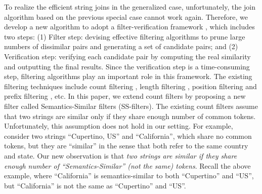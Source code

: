


To realize the efficient string joins in the generalized case,
unfortunately, the join algorithm based on the previous special case
cannot work again. Therefore, we develop a new algorithm to adopt a
filter-verification framework \cite{conf/cpm/SutinenT96,conf/sigmod/LuLWLW13}, which includes two steps: (1) Filter step: devising effective filtering algorithms to prune large numbers of dissimilar pairs and generating a set of candidate pairs; and (2) Verification step: verifying each candidate pair by computing
the real similarity and outputting the final results. Since the verification step is a time-consuming step,  filtering algorithms play an important role in this framework.  The existing filtering techniques include count filtering \cite{conf/vldb/GravanoIJKMS01}, length filtering \cite{conf/vldb/ArasuGK06}, position
filtering \cite{conf/esa/SutinenT95} and prefix filtering \cite{conf/sigmod/WangLF12}, etc. In this paper, we extend count filters by proposing a new filter called Semantics-Similar filters (SS-filters). The existing count filters assume that two strings are similar only if they share enough number of common tokens. Unfortunately, this assumption does not hold in our setting. For example, consider two strings ``\textsf{Cupertino, US}'' and ``\textsf{California}'', which share no common tokens, but  they are ``similar'' in the sense that both refer to the same country and state.   Our new observation is that \textit{two strings are similar if they share enough number of ``Semantics-Similar'' (not the same) tokens}. Recall the above example, where ``\textsf{California}'' is semantics-similar to both ``\textsf{Cupertino}'' and ``\textsf{US}'', but
``\textsf{California}'' is not the same as ``\textsf{Cupertino}'' and ``\textsf{US}''.





